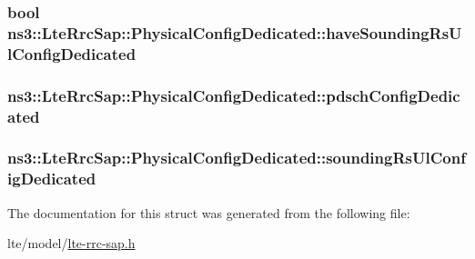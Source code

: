 \subsubsection[{\texorpdfstring{have\+Sounding\+Rs\+Ul\+Config\+Dedicated}{haveSoundingRsUlConfigDedicated}}]{\setlength{\rightskip}{0pt plus 5cm}bool ns3\+::\+Lte\+Rrc\+Sap\+::\+Physical\+Config\+Dedicated\+::have\+Sounding\+Rs\+Ul\+Config\+Dedicated}\hypertarget{structns3_1_1LteRrcSap_1_1PhysicalConfigDedicated_ad21dfb2d8802b28f792b889b68c47761}{}\label{structns3_1_1LteRrcSap_1_1PhysicalConfigDedicated_ad21dfb2d8802b28f792b889b68c47761}
\subsubsection[{\texorpdfstring{pdsch\+Config\+Dedicated}{pdschConfigDedicated}}]{ ns3\+::\+Lte\+Rrc\+Sap\+::\+Physical\+Config\+Dedicated\+::pdsch\+Config\+Dedicated}\hypertarget{structns3_1_1LteRrcSap_1_1PhysicalConfigDedicated_a17e35740747a19ce9aebf834f50c2f4b}{}\label{structns3_1_1LteRrcSap_1_1PhysicalConfigDedicated_a17e35740747a19ce9aebf834f50c2f4b}
\subsubsection[{\texorpdfstring{sounding\+Rs\+Ul\+Config\+Dedicated}{soundingRsUlConfigDedicated}}]{ ns3\+::\+Lte\+Rrc\+Sap\+::\+Physical\+Config\+Dedicated\+::sounding\+Rs\+Ul\+Config\+Dedicated}\hypertarget{structns3_1_1LteRrcSap_1_1PhysicalConfigDedicated_ab37d726f290ebc8cd81e8d4f68939fdc}{}\label{structns3_1_1LteRrcSap_1_1PhysicalConfigDedicated_ab37d726f290ebc8cd81e8d4f68939fdc}


The documentation for this struct was generated from the following file\+:\begin{DoxyCompactItemize}
\item 
lte/model/\hyperlink{lte-rrc-sap_8h}{lte-\/rrc-\/sap.\+h}\end{DoxyCompactItemize}
